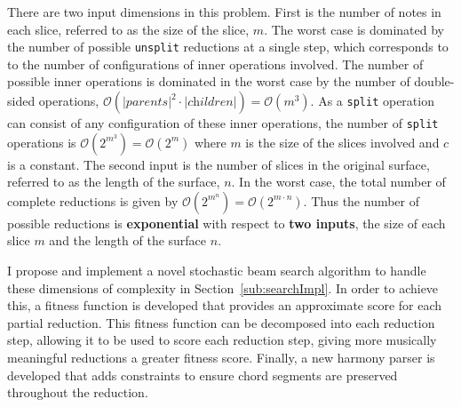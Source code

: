 \documentclass[12pt,a4paper,twoside,openany]{report} \usepackage[pdfborder={0 0 0}]{hyperref}    %
\theoremstyle{definition} \newtheorem{definition}{Definition}[section]
\begin{document}
There are two input dimensions in this problem. 
First is the number of notes in each slice, referred to as the size of the slice, $m$.  
The worst case is dominated by the number of possible \texttt{unsplit} reductions at a single step, which corresponds to to the number of configurations of inner operations involved. 
The number of possible inner operations is dominated in the worst case by the number of double-sided operations, $\mathcal{O}(|\textit{parents}|^2 \cdot |\textit{children}|) = \mathcal{O}(m^3)$. 
    As a \texttt{split} operation can consist of any configuration of these inner operations, the number of \texttt{split} operations is $\mathcal{O}(2^{m^3})
    = \mathcal{O}(2^m)$ where $m$ is the size of the slices involved and $c$ is a constant.
    The second input is the number of slices in the original surface, referred to as the length of the surface, $n$.
    In the worst case, the total number of complete reductions is given by $\mathcal{O}(2^{m^{n}})
    = \mathcal{O}(2^{m \cdot n})$. 
    Thus the number of possible reductions is \textbf{exponential} with respect to \textbf{two inputs}, the size of each slice $m$ and the length of the surface $n$. 

I propose and implement a novel stochastic beam search algorithm to handle these dimensions of complexity in
Section~\ref{sub:searchImpl}. In order to achieve this, a fitness function is developed that provides an approximate
score for each partial reduction. This fitness function can be decomposed into each reduction step, allowing it to be
used to score each reduction step, giving more musically meaningful reductions a greater fitness score. 
Finally, a new harmony parser is developed that adds constraints to ensure chord segments are preserved throughout the reduction.
 
\end{document}

